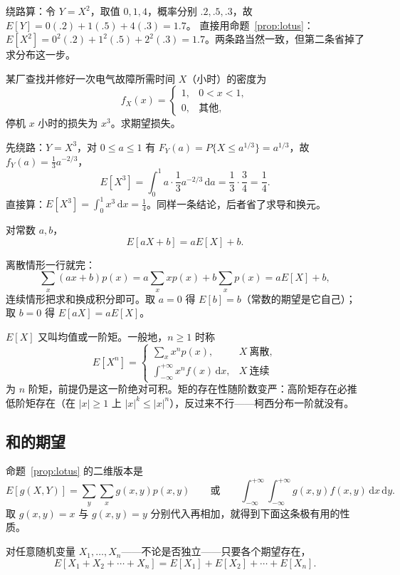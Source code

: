 绕路算：令 $Y=X^2$，取值 $0,1,4$，概率分别 $.2,.5,.3$，故 $E[Y]=0(.2)+1(.5)+4(.3)=1.7$。
直接用命题~\ref{prop:lotus}：$E[X^2]=0^2(.2)+1^2(.5)+2^2(.3)=1.7$。两条路当然一致，但第二条省掉了求分布这一步。

\begin{example}[维修成本]
某厂查找并修好一次电气故障所需时间 $X$（小时）的密度为
\[
f_X(x)=\begin{cases}1, & 0<x<1,\\ 0, & \text{其他},\end{cases}
\]
停机 $x$ 小时的损失为 $x^3$。求期望损失。
\end{example}

先绕路：$Y=X^3$，对 $0\le a\le 1$ 有 $F_Y(a)=P\{X\le a^{1/3}\}=a^{1/3}$，故 $f_Y(a)=\frac13a^{-2/3}$，
\[
E[X^3]=\int_0^1 a\cdot\frac13a^{-2/3}\,\mathrm{d}a=\frac13\cdot\frac34=\frac14 .
\]
直接算：$E[X^3]=\int_0^1x^3\,\mathrm{d}x=\frac14$。同样一条结论，后者省了求导和换元。

\begin{corollary}
对常数 $a,b$，
\[
E[aX+b]=aE[X]+b .
\]
\end{corollary}

离散情形一行就完：
\[
\sum_x(ax+b)p(x)=a\sum_x xp(x)+b\sum_xp(x)=aE[X]+b,
\]
连续情形把求和换成积分即可。取 $a=0$ 得 $E[b]=b$（常数的期望是它自己）；取 $b=0$ 得 $E[aX]=aE[X]$。

$E[X]$ 又叫均值或一阶矩。一般地，$n\ge 1$ 时称
\[
E[X^n]=\begin{cases}\sum_x x^np(x), & X\ \text{离散},\\[2pt] \displaystyle\int_{-\infty}^{+\infty}x^nf(x)\,\mathrm{d}x, & X\ \text{连续}\end{cases}
\]
为 $n$ 阶矩，前提仍是这一阶绝对可积。矩的存在性随阶数变严：高阶矩存在必推低阶矩存在（在 $|x|\ge1$ 上 $|x|^k\le|x|^n$），反过来不行——柯西分布一阶就没有。

\subsection{和的期望}

命题~\ref{prop:lotus} 的二维版本是
\[
E[g(X,Y)]=\sum_y\sum_x g(x,y)p(x,y)
\qquad\text{或}\qquad
\int_{-\infty}^{+\infty}\!\!\int_{-\infty}^{+\infty}g(x,y)f(x,y)\,\mathrm{d}x\,\mathrm{d}y .
\]
取 $g(x,y)=x$ 与 $g(x,y)=y$ 分别代入再相加，就得到下面这条极有用的性质。

\begin{proposition}[期望的可加性]
对任意随机变量 $X_1,\dots,X_n$——不论是否独立——只要各个期望存在，
\[
E[X_1+X_2+\cdots+X_n]=E[X_1]+E[X_2]+\cdots+E[X_n].
\]
\end{proposition}

